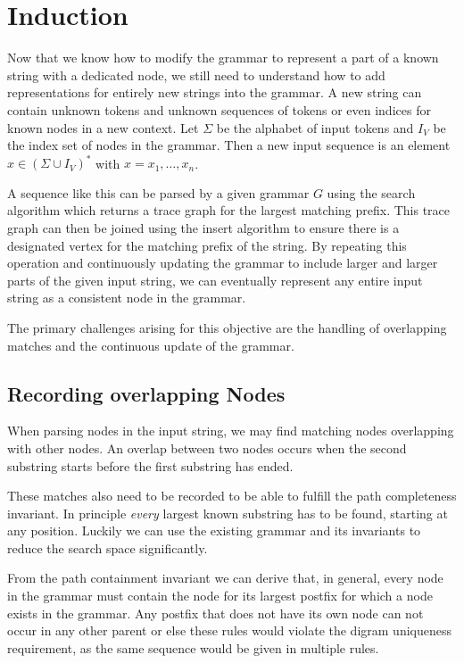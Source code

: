 \section{Induction}
Now that we know how to modify the grammar to represent a part of a known string with a dedicated node, we still need to understand how to add representations for entirely new strings into the grammar. A new string can contain unknown tokens and unknown sequences of tokens or even indices for known nodes in a new context. Let $\Sigma$ be the alphabet of input tokens and $I_V$ be the index set of nodes in the grammar. Then a new input sequence is an element $x \in (\Sigma \cup I_V)^*$ with $x = x_1, \ldots, x_n$.

A sequence like this can be parsed by a given grammar $G$ using the search algorithm which returns a trace graph for the largest matching prefix. This trace graph can then be joined using the insert algorithm to ensure there is a designated vertex for the matching prefix of the string. By repeating this operation and continuously updating the grammar to include larger and larger parts of the given input string, we can eventually represent any entire input string as a consistent node in the grammar.

The primary challenges arising for this objective are the handling of overlapping matches and the continuous update of the grammar.

\subsection{Recording overlapping Nodes}

When parsing nodes in the input string, we may find matching nodes overlapping with other nodes. An overlap between two nodes occurs when the second substring starts before the first substring has ended.

These matches also need to be recorded to be able to fulfill the path completeness invariant. In principle \textit{every} largest known substring has to be found, starting at any position. Luckily we can use the existing grammar and its invariants to reduce the search space significantly.

From the path containment invariant we can derive that, in general, every node in the grammar must contain the node for its largest postfix for which a node exists in the grammar. Any postfix that does not have its own node can not occur in any other parent or else these rules would violate the digram uniqueness requirement, as the same sequence would be given in multiple rules. 


